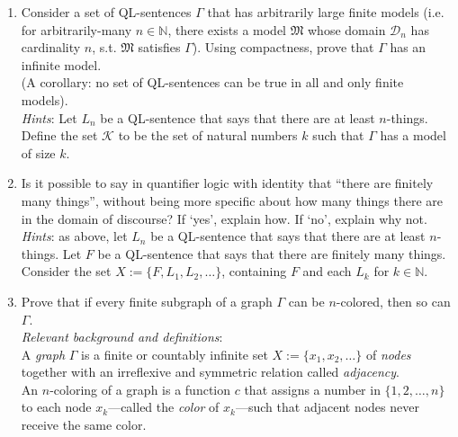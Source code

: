 \documentclass[12pt]{article}
\newcommand*{\metav}[1]{\ensuremath{\mathcal{#1}}}
\begin{document}
\begin{enumerate}

\item Consider a set of QL-sentences $\Gamma $ that has arbitrarily large finite models (i.e. for arbitrarily-many $n \in \mathbb{N}$, there exists a model $\mathfrak{M}$ whose domain $\metav{D}_n$ has cardinality $n$, s.t. $\mathfrak{M}$ satisfies $\Gamma $). Using compactness, prove that $\Gamma$  has an infinite model. \\(A corollary: no set of QL-sentences can be true in all and only finite models). \\
\textit{Hints}: Let $L_n$ be a QL-sentence that says that there are at least $n$-things. \\ Define the set $\metav{K}$ to be the set of natural numbers $k$ such that $\Gamma $ has a model of size $k$. 

\item Is it possible to say in quantifier logic with identity that ``there are finitely many things'', without being more specific about how many things there are in the domain of discourse? If `yes', explain how. If `no', explain why not.  \\ \textit{Hints}: as above, let $L_n$ be a QL-sentence that says that there are at least $n$-things. Let $F$ be a QL-sentence that says that there are finitely many things.  \\ Consider the set $X := \{F, L_1, L_2, \dots \}$, containing $F$ and each $L_k$ for $k \in \mathbb{N}$. 


\item Prove that if every finite subgraph of a graph $\Gamma$ can be $n$-colored, then so can $\Gamma$.\\[1ex]  \textit{Relevant background and definitions}: \\ A \textit{graph} $\Gamma$ is a finite or countably infinite set $X := \{x_1, x_2, \dots\}$ of \textit{nodes} together with an irreflexive and symmetric relation called \textit{adjacency}. \\ An $n$-coloring of a graph is a function $c$ that assigns a number in $\{1, 2, \dots, n\}$ to each node $x_k$---called the \textit{color} of $x_k$---such that adjacent nodes never receive the same color.


\end{enumerate}
\end{document}
